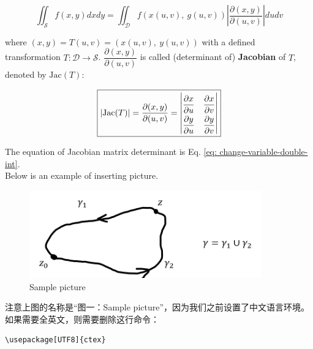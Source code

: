 \documentclass[12pt,a4paper,twoside]{article}
\numberwithin{equation}{section}
\begin{document}
\begin{equation}
    \iint_{\mathcal{S}}f(x,y) dxdy = \iint_{\mathcal{D}}f(x(u, v),\ g(u,v))\left|\dfrac{\partial(x,y)}{\partial(u,v)}\right|dudv
    \label{eq: change-variable-double-int} %
\end{equation}

where $(x,y)=T(u,v)=(x(u,v),\ y(u,v))$ with a defined transformation $T: \mathcal{D}\to \mathcal{S}$. $\dfrac{\partial(x,y)}{\partial(u,v)}$ is called (determinant of) \textbf{Jacobian} of $T$, denoted by $\mathrm{Jac}(T)$:

\begin{equation} %
    \boxed{ %
    |\mathrm{Jac}(T)| = \frac{\partial(x,y)}{\partial(u,v)} =
    \def\arraystretch{2}
    \begin{vmatrix}
    \dfrac{\partial x}{\partial u} & \dfrac{\partial x}{\partial v}\\ 
    \dfrac{\partial y}{\partial u} & \dfrac{\partial y}{\partial v}
    \end{vmatrix}
    }
\end{equation} %

\noindent The equation of Jacobian matrix determinant is Eq. \ref{eq: change-variable-double-int}.\\ %

\noindent Below is an example of inserting picture.
\begin{figure}[ht] %
    \centering %
    \includegraphics[width = 10cm]{closed-curve-two-points.png} %
    \caption{Sample picture} %
    \label{fig: sample} %
\end{figure}

\noindent 注意上图的名称是“图一：Sample picture”，因为我们之前设置了中文语言环境。如果需要全英文，则需要删除这行命令：\begin{verbatim}\usepackage[UTF8]{ctex} \end{verbatim}
\newpage %
\end{document}
